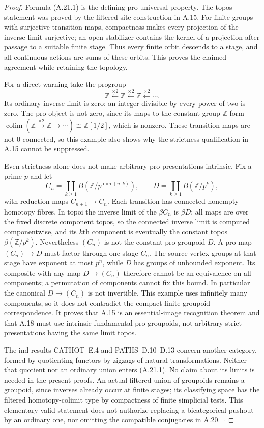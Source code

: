 \begin{proof}
Formula (A.21.1) is the defining pro-universal property. The topos statement was proved by the filtered-site construction in A.15. For finite groups with surjective transition maps, compactness makes every projection of the inverse limit surjective; an open stabilizer contains the kernel of a projection after passage to a suitable finite stage. Thus every finite orbit descends to a stage, and all continuous actions are sums of these orbits. This proves the claimed agreement while retaining the topology.

For a direct warning take the progroup
\[
 \mathbb Z\xleftarrow{\times2}\mathbb Z
             \xleftarrow{\times2}\mathbb Z\xleftarrow{\times2}\cdots.
\]
Its ordinary inverse limit is zero: an integer divisible by every power of two is zero. The pro-object is not zero, since its maps to the constant group $\mathbb Z$ form
$\operatorname{colim}(\mathbb Z\xrightarrow{\times2}\mathbb Z\to\cdots)
\cong\mathbb Z[1/2]$, which is nonzero. These transition maps are not $0$-connected, so this example also shows why the strictness qualification in A.15 cannot be suppressed.

Even strictness alone does not make arbitrary pro-presentations intrinsic. Fix a prime $p$ and let
\[
 C_n=\coprod_{k\ge1}B(\mathbb Z/p^{\min(n,k)}),
 \qquad D=\coprod_{k\ge1}B(\mathbb Z/p^k),
                                                        \tag{A.21.2}
\]
with reduction maps $C_{n+1}\to C_n$. Each transition has connected nonempty homotopy fibres. In topoi the inverse limit of the $\beta C_n$ is $\beta D$: all maps are over the fixed discrete component topos, so the connected inverse limit is computed componentwise, and its $k$th component is eventually the constant topos $\beta(\mathbb Z/p^k)$. Nevertheless $(C_n)$ is not the constant pro-groupoid $D$. A pro-map $(C_n)\to D$ must factor through one stage $C_n$. The source vertex groups at that stage have exponent at most $p^n$, while $D$ has groups of unbounded exponent. Its composite with any map $D\to(C_n)$ therefore cannot be an equivalence on all components; a permutation of components cannot fix this bound. In particular the canonical $D\to(C_n)$ is not invertible. This example uses infinitely many components, so it does not contradict the compact finite-groupoid correspondence. It proves that A.15 is an essential-image recognition theorem and that A.18 must use intrinsic fundamental pro-groupoids, not arbitrary strict presentations having the same limit topos.

The ind-results CATHOT~E.4 and PATHS~D.10--D.13 concern another category, formed by quotienting functors by zigzags of natural transformations. Neither that quotient nor an ordinary union enters (A.21.1). No claim about its limits is needed in the present proofs. An actual filtered union of groupoids remains a groupoid, since inverses already occur at finite stages; its classifying space has the filtered homotopy-colimit type by compactness of finite simplicial tests. This elementary valid statement does not authorize replacing a bicategorical pushout by an ordinary one, nor omitting the compatible conjugacies in A.20. \hfill$\square$
\end{proof}

